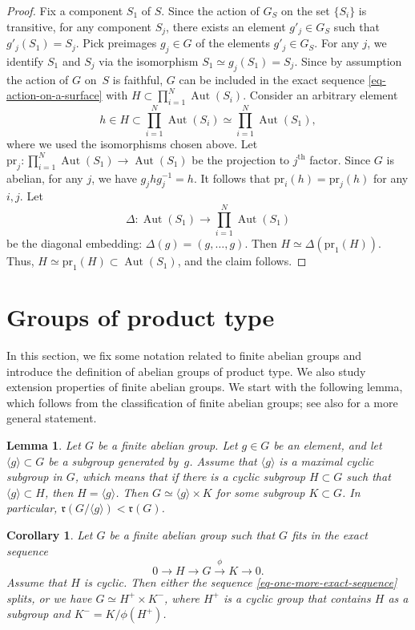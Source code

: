 \documentclass[11pt]{amsart}
\numberwithin{equation}{section}
\newtheorem{corollary}[thm]{Corollary}
\newtheorem{lem}[thm]{Lemma}
\theoremstyle{definition}
\theoremstyle{remark}
\newcommand{\pr}{\mathrm{pr}}
\newcommand{\lra}{\longrightarrow}
\DeclareMathOperator{\Aut}{Aut}
\newcommand{\supth}[1]{\ensuremath{#1^{\mathrm{th}}}}
\begin{document}
\begin{proof} 
Fix a component $S_1$ of $S$. 
Since the action of $G_S$ on the set $\{S_i\}$ is transitive, for any component $S_j$, there exists an element $g'_j\in G_S$ such that $g'_j(S_1)=S_j$. Pick preimages $g_j\in G$ of the elements $g'_j\in G_S$. 
For any $j$, we identify $S_1$ and $S_j$ via the isomorphism $S_1\simeq g_j(S_1)=S_j$. 
Since by assumption the action of $G$ on~$S$ is faithful, $G$ can be included in the exact sequence \eqref{eq-action-on-a-surface} with 
$
H\subset \prod_{i=1}^{N} \Aut(S_i).
$
Consider an arbitrary element 
\[
h\in H\subset \prod_{i=1}^{N} \Aut(S_i)\simeq \prod_{i=1}^N \Aut(S_1), 
\]
where we used the isomorphisms chosen above. 
Let $\pr_j\colon \prod_{i=1}^N \Aut(S_1)\to \Aut(S_1)$ be the projection to $\supth{j}$ factor. 
Since $G$ is abelian, for any $j$, we have $g_jhg_j^{-1}=h$. It follows that $\pr_i(h)=\pr_j(h)$ for any $i, j$. 
Let 
\[
\Delta\colon \Aut(S_1)\lra \prod_{i=1}^N \Aut(S_1)
\] 
be the diagonal embedding: $\Delta(g)=(g,\ldots, g)$. Then $H\simeq \Delta(\pr_1(H))$. Thus, $H\simeq \pr_1(H)\subset  \Aut(S_1)$, and the claim follows. 
\end{proof}


\section{Groups of product type}
\label{sec-product-type}
In this section, we fix some notation related to finite abelian groups and introduce the definition of abelian groups of product type. 
We also study extension properties of finite abelian groups. 
We start with the following lemma, which follows from the classification of finite abelian groups; see also \cite[Theorem 5]{Ka69} for a more general statement. 

\begin{lem}
\label{lem-decreasing-rank}
Let $G$ be a finite abelian group. Let $g\in G$ be an element, and let $\langle g \rangle\subset G$ be a subgroup generated by~$g$. Assume that $\langle g \rangle$ is a maximal cyclic subgroup in $G$, which means that if there is a cyclic subgroup $H\subset G$ such that $\langle g\rangle\subset H$, then $H=\langle g\rangle$.  
Then $G\simeq \langle g \rangle\times K$ for some subgroup $K\subset G$. In particular, $\mathfrak{r}(G/\langle g \rangle)< \mathfrak{r}(G)$.
\end{lem}

\begin{corollary}
\label{cor-another-splitting}
Let $G$ be a finite abelian group such that $G$ fits in the exact sequence
\begin{equation}
\label{eq-one-more-exact-sequence}
0 \lra H \lra G \overset{\phi}\lra  K \lra 0.
\end{equation}
Assume that $H$ is cyclic. Then either the sequence \eqref{eq-one-more-exact-sequence} splits, or we have $G\simeq H^+\times K^-$, where $H^+$ is a cyclic group that contains $H$ as a subgroup and $K^-=K/\phi(H^+)$\color{black}. 
\end{corollary}
\end{document}
